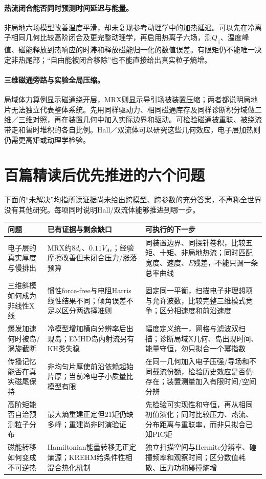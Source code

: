 \documentclass[UTF8,a4paper,11pt,openany,fontset=fandol]{ctexbook}
\begin{document}
\paragraph{热流闭合能否同时预测时间延迟与能量。}非局地六场模型改善温度平滑，却未复现参考动理学中的加热延迟。可以先在冷离子相同几何比较高阶闭合及更完整动理学，再启用热离子六场，测$Q_\parallel$、温度峰值、磁能释放到热响应的时滞和释放磁能归一化的数值误差。有限矩仍不能唯一决定非热尾部；“自由能被闭合移除”也不能直接给出真实粒子熵增。\citep{L244}

\paragraph{三维磁通旁路与实验全局压缩。}局域体力算例显示磁通绕开层，MRX则显示导引场被装置压缩；两者都说明局地片无法独立代表整体系统。先用同样驱动力、相同磁通库存及同样诊断积分域做二维／三维对照，再在装置几何中加入实际边界和驱动。可检验磁通被重联、被绕流带走和暂时堆积的各自比例。Hall／双流体可以研究这些几何效应，电子层加热则仍需更高矩或动理学检验。\citep{L076,F717,L193}


\section{百篇精读后优先推进的六个问题}
下面的“未解决”均指所读证据尚未给出跨模型、跨参数的充分答案，不声称全世界没有其他研究。每项同时说明Hall/双流体能够推进到哪一步。

\begin{longtable}{P{30mm}P{57mm}P{61mm}}
\toprule 问题 & 已有证据与剩余缺口 & 可执行的下一步\\\midrule\endhead
电子层的真实厚度与慢排出 & MRX约$8d_e$、$0.11V_{\!Ae}$；经验摩擦改善但未闭合压力/涨落预算\citep{L119} & 同装置边界、同探针卷积，比较五矩、十矩、非局地热流；同时匹配宽度、速度、$E$残差，不能只调一条总率曲线\\
三维斜模如何成为非线性X线 & 惯性force-free与电阻Harris线性结果不同；倾角误差不足以区分两选择准则\citep{L224,L268,L166} & 固定同一平衡，扫描电子非理想项与允许波数，比较完整三维模式竞争；区分相速度和前沿速度\\
爆发加速何时被岛/涡旋截断 & 冷模型增加横向分辨率后出现岛；EMHD岛内射流另有KH类失稳\citep{L191,F697,E459} & 幅度定义统一，网格与滤波双扫描；诊断局域X几何、岛出现时间、能量守恒，勿只拟合一个幂指数\\
传播记忆能否在真实磁尾保持 & 非均匀片厚使前沿依赖起始片厚；当前冷电子小质量比模型有限\citep{L294} & 在同一几何加入电子压强/导场和不同载流份额，检验历史效应是否仍存在；装置测量加入有限时间/空间分辨\\
高阶矩能否自洽预测粒子分布 & 最大熵重建正定但21矩仍缺多峰；重建尚非时演验证\citep{E553} & 先检验可实现性和守恒，再从相同初值演化；同时比较压力、热流、分布距离与重联率，而非只拟合已知PIC矩\\
磁能转移如何变成不可逆热 & Hamiltonian能量转移无正定熵源；KREHM给条件性相混合热化机制\citep{E512} & 独立扫描空间与Hermite分辨率、碰撞频率和观察时间；区分数值耗散、压力功和碰撞熵增\\
\bottomrule
\end{longtable}
\end{document}
